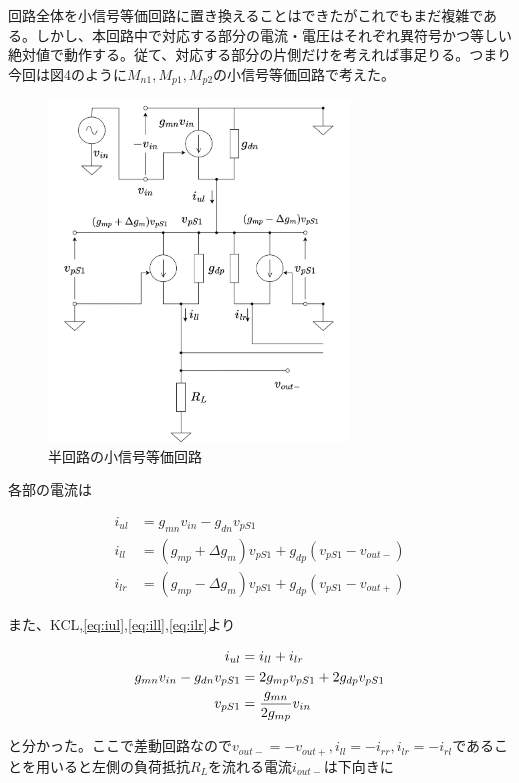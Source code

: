 \documentclass[twocolumn]{jsarticle}
\begin{document}
回路全体を小信号等価回路に置き換えることはできたがこれでもまだ複雑である。しかし、本回路中で対応する部分の電流・電圧はそれぞれ異符号かつ等しい絶対値で動作する。従て、対応する部分の片側だけを考えれば事足りる。つまり今回は図4のように$M_{n1},M_{p1},M_{p2}$の小信号等価回路で考えた。

\begin{figure}[h]
    \begin{center}
        \includegraphics*[width=80mm]{figures/FoldedGilbertHalfBaseEquivalentCircuit.png}
        \caption{半回路の小信号等価回路}
    \end{center}
\end{figure}

各部の電流は

\begin{align}
    i_{ul}&=g_{mn}v_{in}-g_{dn}v_{pS1} \label{eq:iul}\\
    i_{ll}&=(g_{mp}+\Delta g_{m})v_{pS1}+g_{dp}(v_{pS1}-v_{out-}) \label{eq:ill}\\
    i_{lr}&=(g_{mp}-\Delta g_{m})v_{pS1}+g_{dp}(v_{pS1}-v_{out+}) \label{eq:ilr}
\end{align}

また、KCL,\eqref{eq:iul},\eqref{eq:ill},\eqref{eq:ilr}より

\begin{align}
    i_{ul}&=i_{ll}+i_{lr} \notag\\
    g_{mn}v_{in}-g_{dn}v_{pS1}&=2g_{mp}v_{pS1}+2g_{dp}v_{pS1} \notag\\
    v_{pS1}&=\frac{g_{mn}}{2g_{mp}}v_{in} \label{eq:vps}
\end{align}

と分かった。ここで差動回路なので$v_{out-}=-v_{out+},i_{ll}=-i_{rr},i_{lr}=-i_{rl}$であることを用いると左側の負荷抵抗$R_{L}$を流れる電流$i_{out-}$は下向きに
\end{document}

